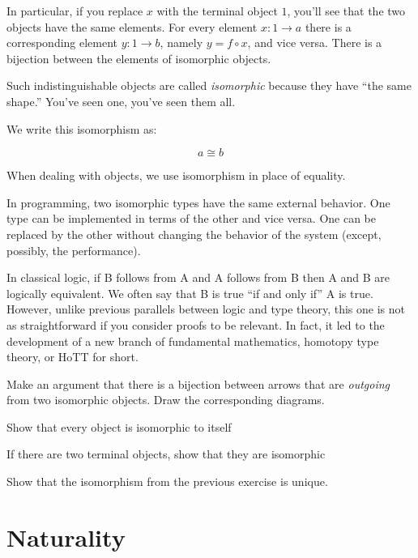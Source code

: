 \documentclass[DaoFP]{subfiles}
\begin{document}
In particular, if you replace $x$ with the terminal object $1$, you'll see that the two objects have the same elements. For every element $x \colon 1 \to a$ there is a corresponding element $y \colon 1 \to b$, namely $y = f \circ x$, and vice versa. There is a bijection between the elements of isomorphic objects.

Such indistinguishable objects are called \emph{isomorphic} because they have ``the same shape.'' You've seen one, you've seen them all. 

We write this isomorphism as:

\[a \cong b\]

When dealing with objects, we use isomorphism in place of equality.

In programming, two isomorphic types have the same external behavior. One type can be implemented in terms of the other and vice versa. One can be replaced by the other without changing the behavior of the system (except, possibly, the performance). 

In classical logic, if B follows from A and A follows from B then A and B are logically equivalent. We often say that B is true ``if and only if'' A is true. However, unlike previous parallels between logic and type theory, this one is not as straightforward if you consider proofs to be relevant. In fact, it led to the development of a new branch of fundamental mathematics, homotopy type theory, or HoTT for short.

\begin{exercise}
Make an argument that there is a bijection between arrows that are \emph{outgoing} from two isomorphic objects. Draw the corresponding diagrams.
\end{exercise}


\begin{exercise}
Show that every object is isomorphic to itself
\end{exercise}

\begin{exercise}
If there are two terminal objects, show that they are isomorphic
\end{exercise}

\begin{exercise}
Show that the isomorphism from the previous exercise is unique.
\end{exercise}

\section{Naturality}
\end{document}
